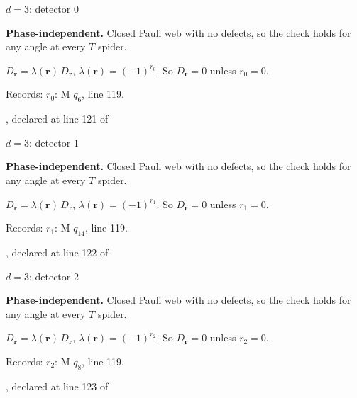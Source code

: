 \label{d3_det000}
{\Large $d=3$: detector 0}\par
\textbf{Phase-independent.} Closed Pauli web with no defects, so the check holds for any angle at every $T$ spider.
\begin{center}
\end{center}
\vspace{-1mm}
$D_{\boldsymbol r}=\lambda(\boldsymbol r)\,D_{\boldsymbol r}$, \quad $\lambda(\boldsymbol r)=(-1)^{r_{0}}$. \qquad So $D_{\boldsymbol r}=0$ unless $r_{0}=0$.
\par\smallskip\begin{minipage}{.98\linewidth}\small Records: $r_{0}$: M $q_{6}$, line 119.\end{minipage}
\vfill
{\footnotesize\texttt{}, declared at line 121 of \texttt{}}
\newpage

\label{d3_det001}
{\Large $d=3$: detector 1}\par
\textbf{Phase-independent.} Closed Pauli web with no defects, so the check holds for any angle at every $T$ spider.
\begin{center}
\end{center}
\vspace{-1mm}
$D_{\boldsymbol r}=\lambda(\boldsymbol r)\,D_{\boldsymbol r}$, \quad $\lambda(\boldsymbol r)=(-1)^{r_{1}}$. \qquad So $D_{\boldsymbol r}=0$ unless $r_{1}=0$.
\par\smallskip\begin{minipage}{.98\linewidth}\small Records: $r_{1}$: M $q_{14}$, line 119.\end{minipage}
\vfill
{\footnotesize\texttt{}, declared at line 122 of \texttt{}}
\newpage

\label{d3_det002}
{\Large $d=3$: detector 2}\par
\textbf{Phase-independent.} Closed Pauli web with no defects, so the check holds for any angle at every $T$ spider.
\begin{center}
\end{center}
\vspace{-1mm}
$D_{\boldsymbol r}=\lambda(\boldsymbol r)\,D_{\boldsymbol r}$, \quad $\lambda(\boldsymbol r)=(-1)^{r_{2}}$. \qquad So $D_{\boldsymbol r}=0$ unless $r_{2}=0$.
\par\smallskip\begin{minipage}{.98\linewidth}\small Records: $r_{2}$: M $q_{8}$, line 119.\end{minipage}
\vfill
{\footnotesize\texttt{}, declared at line 123 of \texttt{}}
\newpage

